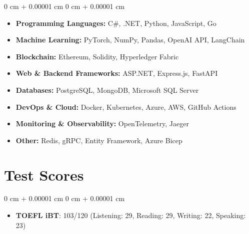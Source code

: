 \documentclass[10pt, letterpaper]{article}
\newenvironment{highlights}{
    \begin{itemize}[
        topsep=0.10 cm,
        parsep=0.10 cm,
        partopsep=0pt,
        itemsep=0pt,
        leftmargin=0 cm + 10pt
    ]
}{
    \end{itemize}
} %
\newenvironment{onecolentry}{
    \begin{adjustwidth}{
        0 cm + 0.00001 cm
    }{
        0 cm + 0.00001 cm
    }
}{
    \end{adjustwidth}
} %
\begin{document}
\begin{onecolentry}
    \begin{highlights}
        \item \textbf{Programming Languages:} C\#, .NET, Python, JavaScript, Go
        \item \textbf{Machine Learning:} PyTorch, NumPy, Pandas, OpenAI API, LangChain
        \item \textbf{Blockchain:} Ethereum, Solidity, Hyperledger Fabric
        \item \textbf{Web \& Backend Frameworks:} ASP.NET, Express.js, FastAPI
        \item \textbf{Databases:} PostgreSQL, MongoDB, Microsoft SQL Server
        \item \textbf{DevOps \& Cloud:} Docker, Kubernetes, Azure, AWS, GitHub Actions
        \item \textbf{Monitoring \& Observability:} OpenTelemetry, Jaeger
        \item \textbf{Other:} Redis, gRPC, Entity Framework, Azure Bicep
    \end{highlights}
\end{onecolentry}

\section{Test Scores}

\begin{onecolentry}
    \begin{highlights}
        \item \textbf{TOEFL iBT}: 103/120 (Listening: 29, Reading: 29, Writing: 22, Speaking: 23)
    \end{highlights}
\end{onecolentry}
\end{document}
